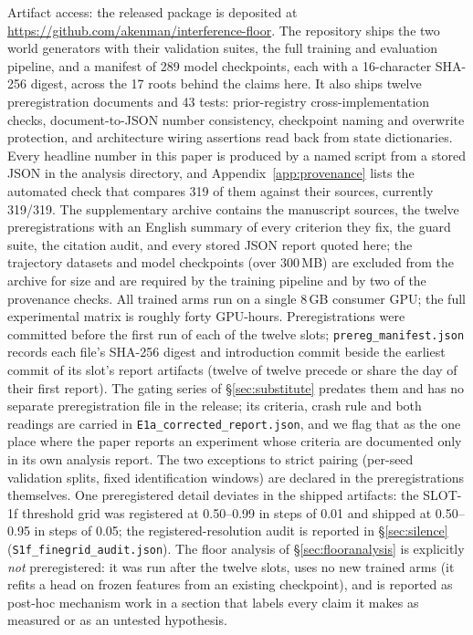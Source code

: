 \documentclass{article}
\begin{document}
Artifact access: the released package is deposited at \url{https://github.com/akenman/interference-floor}. The repository ships the two world generators with their validation suites, the full training and evaluation pipeline, and a manifest of 289 model checkpoints, each with a 16-character SHA-256 digest, across the 17 roots behind the claims here. It also ships twelve preregistration documents and 43 tests: prior-registry cross-implementation checks, document-to-JSON number consistency, checkpoint naming and overwrite protection, and architecture wiring assertions read back from state dictionaries. Every headline number in this paper is produced by a named script from a stored JSON in the analysis directory, and Appendix~\ref{app:provenance} lists the automated check that compares 319 of them against their sources, currently 319/319. The supplementary archive contains the manuscript sources, the twelve preregistrations with an English summary of every criterion they fix, the guard suite, the citation audit, and every stored JSON report quoted here; the trajectory datasets and model checkpoints (over 300\,MB) are excluded from the archive for size and are required by the training pipeline and by two of the provenance checks. All trained arms run on a single 8\,GB consumer GPU; the full experimental matrix is roughly forty GPU-hours. Preregistrations were committed before the first run of each of the twelve slots; \texttt{prereg\_manifest.json} records each file's SHA-256 digest and introduction commit beside the earliest commit of its slot's report artifacts (twelve of twelve precede or share the day of their first report). The gating series of \S\ref{sec:substitute} predates them and has no separate preregistration file in the release; its criteria, crash rule and both readings are carried in \texttt{E1a\_corrected\_report.json}, and we flag that as the one place where the paper reports an experiment whose criteria are documented only in its own analysis report. The two exceptions to strict pairing (per-seed validation splits, fixed identification windows) are declared in the preregistrations themselves. One preregistered detail deviates in the shipped artifacts: the SLOT-1f threshold grid was registered at 0.50--0.99 in steps of 0.01 and shipped at 0.50--0.95 in steps of 0.05; the registered-resolution audit is reported in \S\ref{sec:silence} (\texttt{S1f\_finegrid\_audit.json}). The floor analysis of \S\ref{sec:flooranalysis} is explicitly \emph{not} preregistered: it was run after the twelve slots, uses no new trained arms (it refits a head on frozen features from an existing checkpoint), and is reported as post-hoc mechanism work in a section that labels every claim it makes as measured or as an untested hypothesis.
\end{document}
